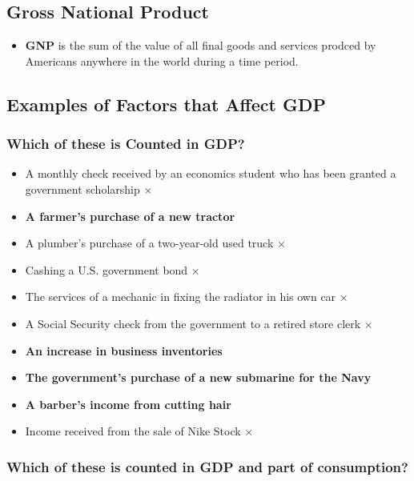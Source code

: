 \documentclass[
  letterpaper,
  DIV=11,
  numbers=noendperiod]{scrartcl}
\providecommand{\tightlist}{%
  \setlength{\itemsep}{0pt}\setlength{\parskip}{0pt}}\usepackage{longtable,booktabs,array}
\begin{document}
\subsection{Gross National Product}\label{gross-national-product}

\begin{itemize}
\tightlist
\item
  \textbf{GNP} is the sum of the value of all final goods and services
  prodced by Americans anywhere in the world during a time period.
\end{itemize}

\subsection{Examples of Factors that Affect
GDP}\label{examples-of-factors-that-affect-gdp}

\subsubsection{Which of these is Counted in
GDP?}\label{which-of-these-is-counted-in-gdp}

\begin{itemize}
\tightlist
\item
  A monthly check received by an economics student who has been granted
  a government scholarship \(\times\)
\item
  \textbf{A farmer's purchase of a new tractor}
\item
  A plumber's purchase of a two-year-old used truck \(\times\)
\item
  Cashing a U.S. government bond \(\times\)
\item
  The services of a mechanic in fixing the radiator in his own car
  \(\times\)
\item
  A Social Security check from the government to a retired store clerk
  \(\times\)
\item
  \textbf{An increase in business inventories}
\item
  \textbf{The government's purchase of a new submarine for the Navy}
\item
  \textbf{A barber's income from cutting hair}
\item
  Income received from the sale of Nike Stock \(\times\)
\end{itemize}

\subsubsection{Which of these is counted in GDP and part of
consumption?}\label{which-of-these-is-counted-in-gdp-and-part-of-consumption}
\end{document}
